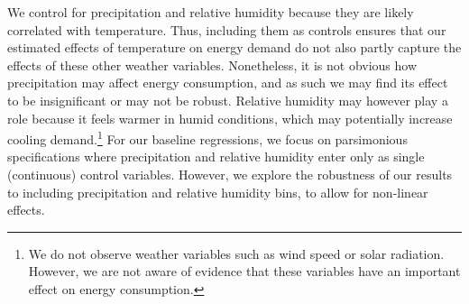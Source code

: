 \documentclass[11pt]{article}
\begin{document}
We control for precipitation and relative humidity because they are likely correlated with temperature. Thus, including them as controls ensures that our estimated effects of temperature on energy demand do not also partly capture the effects of these other weather variables. Nonetheless, it is not obvious how precipitation may affect energy consumption, and as such we may find its effect to be insignificant or may not be robust. Relative humidity may however play a role because it feels warmer in humid conditions, which may potentially increase cooling demand.\footnote{ We do not observe weather variables such as wind speed or solar radiation. However, we are not aware of evidence that these variables have an important effect on energy consumption.} For our baseline regressions, we focus on parsimonious specifications where precipitation and relative humidity enter only as single (continuous) control variables. However, we explore the robustness of our results to including precipitation and relative humidity bins, to allow for non-linear effects.  
\end{document}
